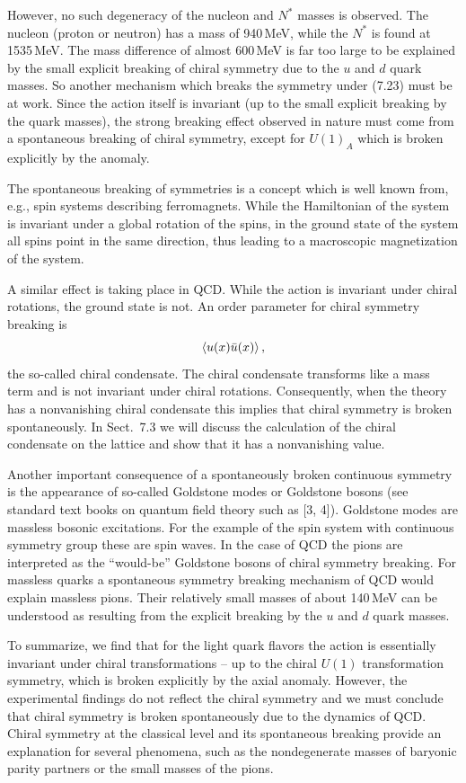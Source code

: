 However, no such degeneracy of the nucleon and $N^*$ masses is observed. The
nucleon (proton or neutron) has a mass of 940\,MeV, while the $N^*$ is found
at 1535\,MeV. The mass difference of almost 600\,MeV is far too large to be
explained by the small explicit breaking of chiral symmetry due to the $u$ and
$d$ quark masses. So another mechanism which breaks the symmetry under (7.23)
must be at work. Since the action itself is invariant (up to the small
explicit breaking by the quark masses), the strong breaking effect observed in
nature must come from a spontaneous breaking of chiral symmetry, except for
$U(1)_A$ which is broken explicitly by the anomaly.

The spontaneous breaking of symmetries is a concept which is well known from,
e.g., spin systems describing ferromagnets. While the Hamiltonian of the
system is invariant under a global rotation of the spins, in the ground state
of the system all spins point in the same direction, thus leading to a
macroscopic magnetization of the system.

A similar effect is taking place in QCD. While the action is invariant under
chiral rotations, the ground state is not. An order parameter for chiral
symmetry breaking is
\begin{equation}
  \left\langle u(x)\bar{u}(x) \right\rangle,
\end{equation}
the so-called chiral condensate. The chiral condensate transforms like a mass
term and is not invariant under chiral rotations. Consequently, when the
theory has a nonvanishing chiral condensate this implies that chiral symmetry
is broken spontaneously. In Sect.~7.3 we will discuss the calculation of the
chiral condensate on the lattice and show that it has a nonvanishing value.

Another important consequence of a spontaneously broken continuous symmetry
is the appearance of so-called Goldstone modes or Goldstone bosons (see
standard text books on quantum field theory such as [3, 4]). Goldstone modes
are massless bosonic excitations. For the example of the spin system with
continuous symmetry group these are spin waves. In the case of QCD the pions
are interpreted as the ``would-be'' Goldstone bosons of chiral symmetry
breaking. For massless quarks a spontaneous symmetry breaking mechanism of QCD
would explain massless pions. Their relatively small masses of about 140\,MeV
can be understood as resulting from the explicit breaking by the $u$ and $d$
quark masses.

To summarize, we find that for the light quark flavors the action is
essentially invariant under chiral transformations -- up to the chiral $U(1)$
transformation symmetry, which is broken explicitly by the axial anomaly.
However, the experimental findings do not reflect the chiral symmetry and we
must conclude that chiral symmetry is broken spontaneously due to the dynamics
of QCD. Chiral symmetry at the classical level and its spontaneous breaking
provide an explanation for several phenomena, such as the nondegenerate masses
of baryonic parity partners or the small masses of the pions.

